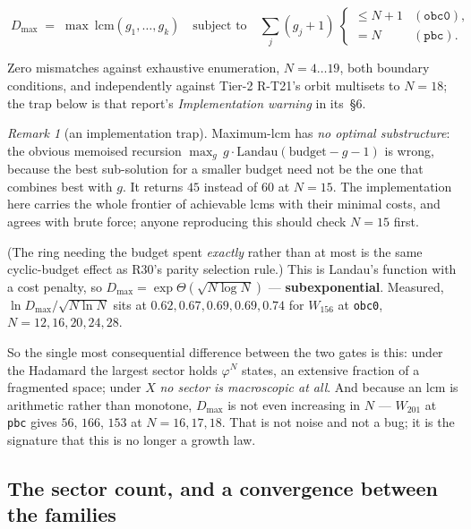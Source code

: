 \documentclass[11pt]{article}
\newcommand{\rt}[1]{\texttt{#1}}
\theoremstyle{plain}
\theoremstyle{remark}
\newtheorem{remark}{Remark}
\begin{document}
\begin{equation}
\boxed{\;
D_{\max} \;=\; \max\ \mathrm{lcm}(g_1,\ldots,g_k)
\quad\text{subject to}\quad
\sum_j (g_j+1)\ \begin{cases}\le N+1 & (\rt{obc0}),\\ = N & (\rt{pbc}).\end{cases}}
\end{equation}

\noindent Zero mismatches against exhaustive enumeration, $N=4\ldots19$, both
boundary conditions, and independently against Tier-2 R-T21's orbit multisets to
$N=18$; the trap below is that report's \emph{Implementation warning} in
its~\S6.

\begin{remark}[an implementation trap]
Maximum-lcm has \emph{no optimal substructure}: the obvious memoised recursion
$\max_g\, g\cdot\mathrm{Landau}(\text{budget}-g-1)$ is wrong, because the best
sub-solution for a smaller budget need not be the one that combines best with
$g$. It returns $45$ instead of $60$ at $N=15$. The implementation here carries
the whole frontier of achievable lcms with their minimal costs, and agrees with
brute force; anyone reproducing this should check $N=15$ first.
\end{remark} (The ring needing the budget spent \emph{exactly} rather
than at most is the same cyclic-budget effect as R30's parity selection rule.)
This is Landau's function with a cost penalty, so
$D_{\max}=\exp\Theta(\sqrt{N\log N})$ --- \textbf{subexponential}. Measured,
$\ln D_{\max}/\sqrt{N\ln N}$ sits at $0.62,0.67,0.69,0.69,0.74$ for $W_{156}$ at
\rt{obc0}, $N=12,16,20,24,28$.

So the single most consequential difference between the two gates is this: under
the Hadamard the largest sector holds $\varphi^N$ states, an extensive fraction of
a fragmented space; under $X$ \emph{no sector is macroscopic at all}. And because
an lcm is arithmetic rather than monotone, $D_{\max}$ is not even increasing in
$N$ --- $W_{201}$ at \rt{pbc} gives $56$, $166$, $153$ at $N=16,17,18$. That is
not noise and not a bug; it is the signature that this is no longer a growth law.

\subsection{The sector count, and a convergence between the families}
\end{document}
